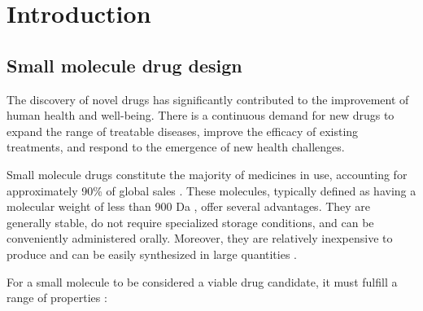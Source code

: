 \chapter{Introduction\label{chap:introduction}}

\section{Small molecule drug design\label{sec:drug-design}}

The discovery of novel drugs has significantly contributed to the improvement of human health and
well-being. There is a continuous demand for new drugs to expand the range of treatable diseases,
improve the efficacy of existing treatments, and respond to the emergence of new health challenges.

Small molecule drugs constitute the majority of medicines in use, accounting for approximately 90\%
of global sales \citep{makurvetBiologicsVsSmall2021}. These molecules, typically defined as having a
molecular weight of less than 900 Da \citep{todo}, offer several advantages. They are generally stable, do not
require specialized storage conditions, and can be conveniently administered orally. Moreover, they
are relatively inexpensive to produce and can be easily synthesized in large quantities
\citep{southeyIntroductionSmallMolecule2023}.

For a small molecule to be considered a viable drug candidate, it must fulfill a range of properties
\citep{southeyIntroductionSmallMolecule2023}:

